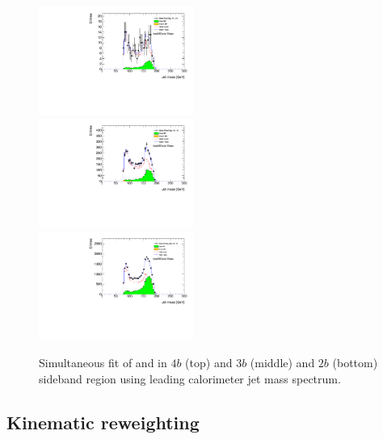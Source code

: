 \begin{figure}[htbp!]
\begin{center}
 \includegraphics[width=0.45\textwidth,angle=-90]{figures/boosted/Fit/fitNorm_i4.pdf}\\
 \includegraphics[width=0.45\textwidth,angle=-90]{figures/boosted/Fit/fitNorm_i3.pdf}\\
 \includegraphics[width=0.45\textwidth,angle=-90]{figures/boosted/Fit/fitNorm_i2s.pdf}\\
\caption{Simultaneous fit of \muqcd and \alphatt in $4b$ (top) and $3b$ (middle) and $2b$ (bottom) sideband region using leading \largeR calorimeter jet mass spectrum.}
\label{fig:ttbar-fit}
\end{center}
\end{figure}

\clearpage


\subsection{Kinematic reweighting}
\label{sec:boosted-reweight}



